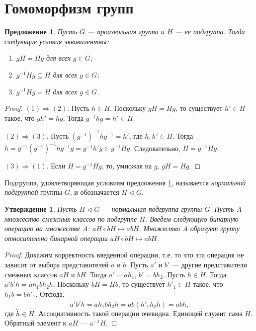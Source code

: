 \documentclass[12pt, titlepage, oneside]{amsbook}
\newtheorem{proposition}[theorem]{Предложение}
\newtheorem{claim}[theorem]{Утверждение}
\theoremstyle{definition}
\theoremstyle{remark}
\begin{document}
\section{Гомоморфизм групп}

\begin{proposition}
	\label{NormGr} Пусть $G$ --- произвольная группа и $H$ --- ее
	подгруппа. Тогда следующие условия эквивалентны:
	\begin{enumerate}
		\item $gH=Hg$ для всех $g\in G$;
		\item $g^{-1}Hg\subseteq H$ для всех $g\in G$;
		\item $g^{-1}Hg=H$ для всех $g\in G$.
	\end{enumerate}
\end{proposition}

\begin{proof}
	$(1)\Rightarrow (2)$. Пусть $h\in H$. Поскольку $gH=Hg$, то существует $h'\in H$ такое, что $gh'=hg$. Тогда $g^{-1}hg=h'\in H$.
	
	$(2)\Rightarrow (3)$. Пусть $(g^{-1})^{-1}hg^{-1}=h'$, где $h,h'\in H$. Тогда
	$h=g^{-1}(g^{-1})^{-1}hg^{-1}g=g^{-1}h'g\in g^{-1}Hg$.
	Следовательно, $H=g^{-1}Hg$.
	
	$(3)\Rightarrow (1)$. Если $H=g^{-1}Hg$, то, умножая на $g$,
	$gH=Hg$.
\end{proof}

Подгруппа, удовлетворяющая условиям предложения \ref{NormGr},
называется \emph{нормальной подгруппой} группы $G$, и обозначается
$H\triangleleft G$.

\begin{claim}
	\label{Gr5} Пусть $H\triangleleft G$ --- нормальная подгруппа
	группы $G$. Пусть $A$ --- множество смежных классов по подгруппе
	$H$. Введем следующую бинарную операцию на множестве $A$: $aH\circ
		bH\mapsto abH$. Множество $A$ образует группу относительно бинарной
	операции $aH\circ bH\mapsto abH$.
\end{claim}

\begin{proof}
	Докажим корректность введенной операции, т.е. то что эта операция не
	зависит от выбора представителей $a$ и $b$. Пусть $a'$ и $b'$ ---
	другие представители смежных классов $aH$ и $bH$. Тогда $a'=ah_1$, $b'=bh_2$. Пусть $h\in H$. Тогда $a'b' h=ah_1bh_2 h$. Поскольку $bH=Hb$, то существует $h'_1\in H$ такое, что $h_1b=bh'_1$. Отсюда, $$a'b' h=ah_1bh_2 h=ab(h'_1h_2h)=ab\tilde{h},$$ где $\tilde{h}\in H$.
	Ассоциативность такой операции
	очевидна. Единицей служит сама $H$. Обратный элемент к $aH$ ---
	$a^{-1}H$.
\end{proof}
\end{document}
